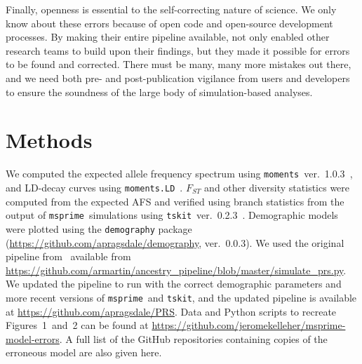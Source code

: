 \documentclass{article}
\newcommand{\msprime}[0]{\texttt{msprime}}
\newcommand{\tskit}[0]{\texttt{tskit}}
\begin{document}
Finally, openness is essential to the self-correcting nature of science.
We only know about these errors because of open code and
open-source development processes. By making their entire pipeline available,
\citet{martin2017human} not only enabled other research teams to build upon their findings,
but they made it possible for errors to be found and corrected.
There must be many, many more mistakes out there, and we need both
pre- and post-publication vigilance from users and developers to ensure the
soundness of the large body of simulation-based analyses.

\section*{Methods}

We computed the expected allele frequency spectrum using
\texttt{moments}~ver.~1.0.3~\citep{jouganous2017inferring}, and LD-decay curves using
\texttt{moments.LD}~\citep{ragsdale2019models}. $F_{ST}$ and other diversity statistics
were computed from the expected AFS and verified using branch statistics from
the output of \msprime\ simulations using \tskit~ver.~0.2.3~\citep{ralph2020efficiently}.
Demographic models were plotted using the \texttt{demography} package
(\url{https://github.com/apragsdale/demography}, ver.~0.0.3).
We used the original pipeline from~\citet{martin2017human} available from
\url{https://github.com/armartin/ancestry_pipeline/blob/master/simulate_prs.py}.
We updated the pipeline to run with the correct demographic parameters and more
recent versions of \msprime\ and \tskit, and the updated pipeline is
available at \url{https://github.com/apragsdale/PRS}.
Data and Python scripts to recreate Figures~1~and~2 can be found at
\url{https://github.com/jeromekelleher/msprime-model-errors}.
A full list of the GitHub repositories containing copies of the erroneous
model are also given here.
\end{document}

